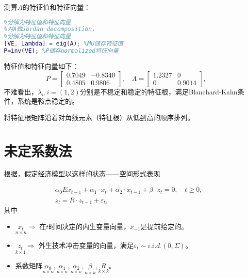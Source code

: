 测算$A$的特征值和特征向量：
\begin{lstlisting}[language=matlab, frame=single]
%对A做Jordan decomposition，
%分解为特征值和特征向量
%对A做Jordan decomposition，
%分解为特征值和特征向量
[VE, Lambda] = eig(A); %MU储存特征值
P=inv(VE); %P储存normalized特征向量
\end{lstlisting}
特征值和特征向量如下：
\begin{equation*}
  P=\begin{bmatrix}
    0.7049&   -0.8340 \\
    0.4805&    0.9806
  \end{bmatrix}, \quad \Lambda = \begin{bmatrix}
  1.2327    &     0 \\
     0    & 0.9014
  \end{bmatrix},
\end{equation*}
不难看出，$\lambda_{i},i=(1,2)$分别是不稳定和稳定的特征根，满足Blanchard-Kahn条件，系统是鞍点稳定的。

将特征根矩阵沿着对角线元素（特征根）从低到高的顺序排列。



\section{未定系数法}
\label{sec:simple-christiano-undetermined-coefficients}
根据\cite{Christiano:2002uk}，假定经济模型以这样的状态——空间形式表现

\begin{equation}
  \label{eq:simple-christiano-state-space}
  \begin{split}
    &\alpha_0 E x_{t+1} + \alpha_1 \cdot x_t + \alpha_2 \cdot x_{t-1} + \beta \cdot z_t = 0, \quad t \ge 0, \\
    &z_t = R \cdot z_{t-1} + \varepsilon_t,
  \end{split}
\end{equation}
其中
\begin{itemize}
  \item $\underset{n \times n}{x_{t}} \Rightarrow$ 在$t$时间决定的内生变量向量，$x_{-1}$是提前给定的。
  \item $\underset{k \times 1}{z_t} \Rightarrow$ 外生技术冲击变量的向量，满足$\varepsilon_{t} \sim i.i.d.(0,\Sigma)$。
  \item 系数矩阵$\underset{n \times n}{\alpha_0}, \underset{n \times n}{\alpha_1}, \underset{n \times n}{\alpha_2}, \underset{n \times k}{\beta}, \underset{k \times k}{R}$。
\end{itemize}

